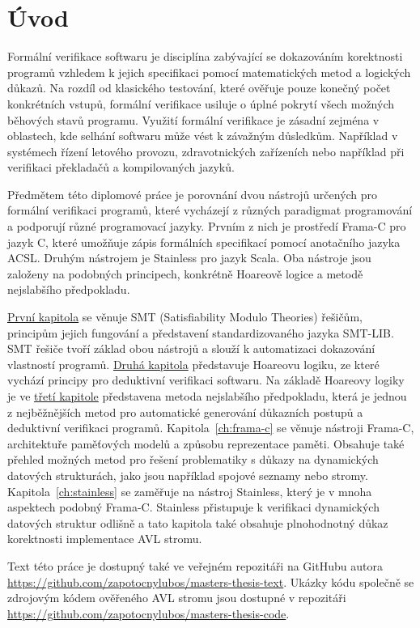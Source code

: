\chapter*{Úvod}

Formální verifikace softwaru je disciplína zabývající se dokazováním korektnosti programů
vzhledem k jejich specifikaci pomocí matematických metod a logických důkazů.
Na rozdíl od klasického testování, které ověřuje pouze konečný počet konkrétních vstupů,
formální verifikace usiluje o úplné pokrytí všech možných běhových stavů programu.
Využití formální verifikace je zásadní zejména v oblastech,
kde selhání softwaru může vést k závažným důsledkům.
Například v systémech řízení letového provozu,
zdravotnických zařízeních nebo například při verifikaci překladačů a kompilovaných jazyků.

Předmětem této diplomové práce je porovnání dvou nástrojů určených pro formální verifikaci programů,
které vycházejí z různých paradigmat programování a podporují různé programovací jazyky.
Prvním z nich je prostředí Frama\mbox{-}C pro jazyk C,
které umožňuje zápis formálních specifikací pomocí anotačního jazyka ACSL\@.
Druhým nástrojem je Stainless pro jazyk Scala.
Oba nástroje jsou založeny na podobných principech,
konkrétně Hoareově logice a metodě nejslabšího předpokladu.

\hyperref[ch:smt]{První kapitola} se věnuje SMT (Satisfiability Modulo Theories) řešičům,
principům jejich fungování a představení standardizovaného jazyka SMT-LIB\@.
SMT řešiče tvoří základ obou nástrojů a slouží k automatizaci dokazování vlastností programů.
\hyperref[ch:hoareova-logika]{Druhá kapitola} představuje Hoareovu logiku,
ze které vychází principy pro deduktivní verifikaci softwaru.
Na základě Hoareovy logiky je ve \hyperref[ch:metoda-nejslabsiho-predpokladu]{třetí kapitole}
představena metoda nejslabšího předpokladu,
která je jednou z nejběžnějších metod pro automatické generování důkazních postupů
a deduktivní verifikaci programů.
Kapitola~\ref{ch:frama-c} se věnuje nástroji Frama\mbox{-}C,
architektuře paměťových modelů a způsobu reprezentace paměti.
Obsahuje také přehled možných metod pro řešení
problematiky s důkazy na dynamických datových strukturách,
jako jsou například spojové seznamy nebo stromy.
Kapitola~\ref{ch:stainless} se zaměřuje na nástroj Stainless,
který je v mnoha aspektech podobný Frama\mbox{-}C\@.
Stainless přistupuje k verifikaci dynamických datových struktur
odlišně a tato kapitola také obsahuje plnohodnotný důkaz
korektnosti implementace AVL stromu.

\newpage

Text této práce je dostupný také ve veřejném repozitáři na GitHubu autora
\url{https://github.com/zapotocnylubos/masters-thesis-text}.
Ukázky kódu společně se zdrojovým kódem ověřeného AVL stromu
jsou dostupné v repozitáři \url{https://github.com/zapotocnylubos/masters-thesis-code}.

